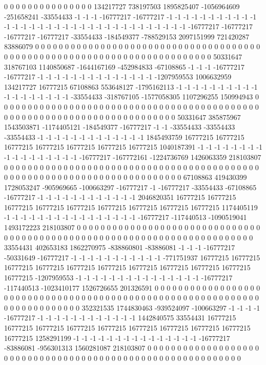 0 0 0 0 0 0 0 0 0 0 0 0 0 0 0 134217727 738197503 1895825407 -1056964609 -251658241 -33554433 -1 -1 -1 -16777217 -16777217 -1 -1 -1 -1 -1 -1 -1 -1 -1 -1 -1 -1 -1 -1 -1 -1 -1 -1 -1 -1 -1 -1 -1 -1 -1 -1 -1 -1 -1 -1 -1 -1 -1 -16777217 -16777217 -16777217 -16777217 -33554433 -184549377 -788529153 2097151999 721420287 83886079 0 0 0 0 0 0 0 0 0 0 0 0 0 0 0 0 0 0 0 0 0 0 0 0 0 0 0 0 0 0 0 0 0 0 0 0 0 0 0 0 0 0 0 0 0 0 0 0 0 0 0 0 0 0 0 0 0 0 0
0 0 0 0 0 0 0 0 0 0 0 0 0 0 50331647 318767103 1140850687 -1644167169 -452984833 -67108865 -1 -1 -1 -16777217 -16777217 -1 -1 -1 -1 -1 -1 -1 -1 -1 -1 -1 -1 -1 -1 -1207959553 1006632959 134217727 16777215 67108863 553648127 -1795162113 -1 -1 -1 -1 -1 -1 -1 -1 -1 -1 -1 -1 -1 -1 -1 -1 -1 -1 -33554433 -318767105 -1577058305 1107296255 150994943 0 0 0 0 0 0 0 0 0 0 0 0 0 0 0 0 0 0 0 0 0 0 0 0 0 0 0 0 0 0 0 0 0 0 0 0 0 0 0 0 0 0 0 0 0 0 0 0 0 0 0 0 0 0 0 0 0 0 0
0 0 0 0 0 0 0 0 0 0 0 0 0 0 50331647 385875967 1543503871 -1174405121 -184549377 -16777217 -1 -1 -33554433 -33554433 -33554433 -1 -1 -1 -1 -1 -1 -1 -1 -1 -1 -1 -1 -1 1845493759 16777215 16777215 16777215 16777215 16777215 16777215 16777215 1040187391 -1 -1 -1 -1 -1 -1 -1 -1 -1 -1 -1 -1 -1 -1 -1 -1 -1 -16777217 -167772161 -1224736769 1426063359 218103807 0 0 0 0 0 0 0 0 0 0 0 0 0 0 0 0 0 0 0 0 0 0 0 0 0 0 0 0 0 0 0 0 0 0 0 0 0 0 0 0 0 0 0 0 0 0 0 0 0 0 0 0 0 0 0 0 0 0 0
0 0 0 0 0 0 0 0 0 0 0 0 0 0 67108863 419430399 1728053247 -905969665 -100663297 -16777217 -1 -16777217 -33554433 -67108865 -16777217 -1 -1 -1 -1 -1 -1 -1 -1 -1 -1 -1 -1 2046820351 16777215 16777215 16777215 16777215 16777215 16777215 16777215 16777215 16777215 1174405119 -1 -1 -1 -1 -1 -1 -1 -1 -1 -1 -1 -1 -1 -1 -1 -1 -16777217 -117440513 -1090519041 1493172223 218103807 0 0 0 0 0 0 0 0 0 0 0 0 0 0 0 0 0 0 0 0 0 0 0 0 0 0 0 0 0 0 0 0 0 0 0 0 0 0 0 0 0 0 0 0 0 0 0 0 0 0 0 0 0 0 0 0 0 0 0
0 0 0 0 0 0 0 0 0 0 0 0 0 0 33554431 402653183 1862270975 -838860801 -83886081 -1 -1 -1 -16777217 -50331649 -16777217 -1 -1 -1 -1 -1 -1 -1 -1 -1 -1 -1 -771751937 16777215 16777215 16777215 16777215 16777215 16777215 16777215 16777215 16777215 16777215 16777215 -1207959553 -1 -1 -1 -1 -1 -1 -1 -1 -1 -1 -1 -1 -1 -1 -1 -16777217 -117440513 -1023410177 1526726655 201326591 0 0 0 0 0 0 0 0 0 0 0 0 0 0 0 0 0 0 0 0 0 0 0 0 0 0 0 0 0 0 0 0 0 0 0 0 0 0 0 0 0 0 0 0 0 0 0 0 0 0 0 0 0 0 0 0 0 0 0
0 0 0 0 0 0 0 0 0 0 0 0 0 0 0 352321535 1744830463 -939524097 -100663297 -1 -1 -1 -1 -16777217 -1 -1 -1 -1 -1 -1 -1 -1 -1 -1 -1 -1 1442840575 33554431 16777215 16777215 16777215 16777215 16777215 16777215 16777215 16777215 16777215 16777215 1258291199 -1 -1 -1 -1 -1 -1 -1 -1 -1 -1 -1 -1 -1 -1 -1 -16777217 -83886081 -956301313 1560281087 218103807 0 0 0 0 0 0 0 0 0 0 0 0 0 0 0 0 0 0 0 0 0 0 0 0 0 0 0 0 0 0 0 0 0 0 0 0 0 0 0 0 0 0 0 0 0 0 0 0 0 0 0 0 0 0 0 0 0 0 0
